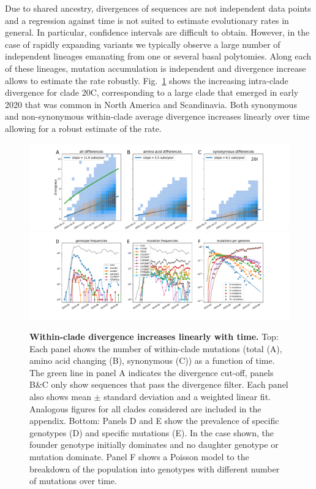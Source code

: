 \documentclass[aps,rmp, twocolumn]{revtex4}
\begin{document}
Due to shared ancestry, divergences of sequences are not independent data points and a regression against time is not suited to estimate evolutionary rates in general.
In particular, confidence intervals are difficult to obtain.
However, in the case of rapidly expanding variants we typically observe a large number of independent lineages emanating from one or several basal polytomies.
Along each of these lineages, mutation accumulation is independent and divergence increase allows to estimate the rate robustly.
Fig.~\ref{fig:within_clade} shows the increasing intra-clade divergence for clade 20C, corresponding to a large clade that emerged in early 2020 that was common in North America and Scandinavia.
Both synonymous and non-synonymous within-clade average divergence increases linearly over time allowing for a robust estimate of the rate.

\begin{figure}[tb]
    \includegraphics[width=\textwidth]{figures/rtt/20I_rtt.pdf}
    \includegraphics[width=\textwidth]{figures/counts/20C_counts.pdf}
    \caption{{\bf Within-clade divergence increases linearly with time.} Top: Each panel shows the number of within-clade mutations (total (A), amino acid changing (B), synonymous (C)) as a function of time.
    The green line in panel A indicates the divergence cut-off, panels B\&C only show sequences that pass the divergence filter. Each panel also shows mean $\pm$ standard deviation and a weighted linear fit. Analogous figures for all clades considered are included in the appendix.
    Bottom: Panels D and E show the prevalence of specific genotypes (D) and specific mutations (E). In the case shown, the founder genotype initially dominates and no daughter genotype or mutation dominate. Panel F shows a Poisson model to the breakdown of the population into genotypes with different number of mutations over time.
    \label{fig:within_clade}}
\end{figure}
\end{document}
